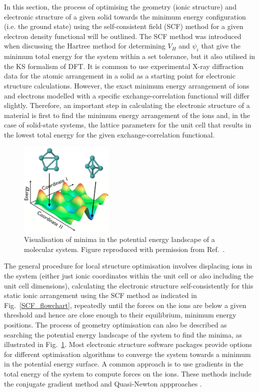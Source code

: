 \documentclass[11pt, twoside]{report}
\begin{document}
In this section, the process of optimising the geometry (ionic structure) and electronic structure of a given solid towards the minimum energy configuration (i.e. the ground state) using the self-consistent field (SCF) method for a given electron density functional will be outlined. The SCF method was introduced when discussing the Hartree method for determining $V_H$ and $\psi_i$ that give the minimum total energy for the system within a set tolerance, but it also utilised in the KS formalism of DFT. It is common to use experimental X-ray diffraction data for the atomic arrangement in a solid as a starting point for electronic structure calculations. However, the exact minimum energy arrangement of ions and electrons modelled with a specific exchange-correlation functional will differ slightly. Therefore, an important step in calculating the electronic structure of a material is first to find the minimum energy arrangement of the ions and, in the case of solid-state systems, the lattice parameters for the unit cell that results in the lowest total energy for the given exchange-correlation functional.
\begin{figure}[h!]
  \centering
    \includegraphics[width=0.4\textwidth]{figures/PE_landscape}
    \caption[Visualisation of minima in the potential energy landscape of a molecular system.]{Visualisation of minima in the potential energy landscape of a molecular system. Figure reproduced with permission from Ref.~.}
  \label{PE_landscape}
\end{figure}

The general procedure for local structure optimisation involves displacing ions in the system (either just ionic coordinates within the unit cell or also including the unit cell dimensions), calculating the electronic structure self-consistently for this static ionic arrangement using the SCF method as indicated in Fig.~\ref{SCF_flowchart}, repeatedly until the forces on the ions are below a given threshold and hence are close enough to their equilibrium, minimum energy positions. The process of geometry optimisation can also be described as searching the potential energy landscape of the system to find the minima, as illustrated in Fig.~\ref{PE_landscape}. Most electronic structure software packages provide options for different optimisation algorithms to converge the system towards a minimum in the potential energy surface. A common approach is to use gradients in the total energy of the system to compute forces on the ions. These methods include the conjugate gradient method and Quasi-Newton appproaches \cite{FHI-aims_slides_Lange}.
\end{document}

